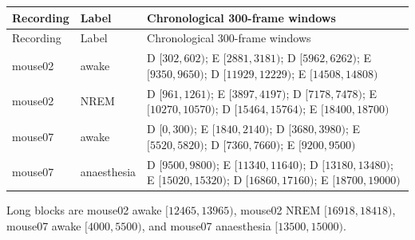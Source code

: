 \documentclass[11pt,a4paper]{article}
\begin{document}
\begin{longtable}{@{}llP{0.65\textwidth}@{}}
\toprule
Recording & Label & Chronological 300-frame windows\\
\midrule
\endfirsthead
\toprule
Recording & Label & Chronological 300-frame windows\\
\midrule
\endhead
mouse02 & awake &
D $[302,602)$; E $[2881,3181)$; D $[5962,6262)$; E $[9350,9650)$;
D $[11929,12229)$; E $[14508,14808)$\\
mouse02 & NREM &
D $[961,1261)$; E $[3897,4197)$; D $[7178,7478)$; E $[10270,10570)$;
D $[15464,15764)$; E $[18400,18700)$\\
mouse07 & awake &
D $[0,300)$; E $[1840,2140)$; D $[3680,3980)$; E $[5520,5820)$;
D $[7360,7660)$; E $[9200,9500)$\\
mouse07 & anaesthesia &
D $[9500,9800)$; E $[11340,11640)$; D $[13180,13480)$; E $[15020,15320)$;
D $[16860,17160)$; E $[18700,19000)$\\
\bottomrule
\end{longtable}

Long blocks are mouse02 awake $[12465,13965)$, mouse02 NREM
$[16918,18418)$, mouse07 awake $[4000,5500)$, and mouse07 anaesthesia
$[13500,15000)$.



\end{document}
